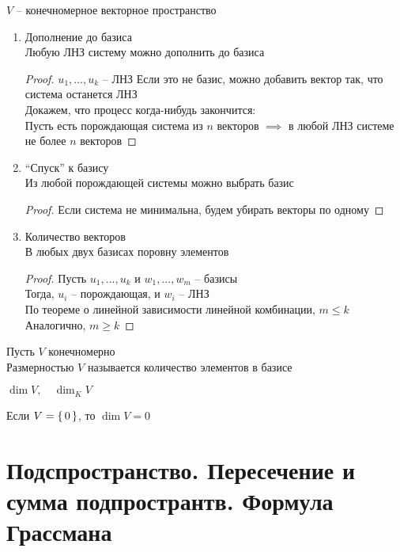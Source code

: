 \begin{properties}[базиса]
	$ V $ -- конечномерное векторное пространство
    \begin{enumerate}
    	\item Дополнение до базиса \\
        Любую ЛНЗ систему можно дополнить до базиса
        \begin{proof}
            $ u_1, ..., u_k $ -- ЛНЗ
            Если это не базис, можно добавить вектор так, что система останется ЛНЗ\footnotemark \\
            Докажем, что процесс когда-нибудь закончится: \\
            Пусть есть порождающая система из $n$ векторов $ \implies $ в любой ЛНЗ системе не более $n$ векторов
        \end{proof}
        \item ``Спуск'' к базису \\
        Из любой порождающей системы можно выбрать базис
        \begin{proof}
        	Если система не минимальна, будем убирать векторы по одному
        \end{proof}
        \item Количество векторов \\
        В любых двух базисах поровну элементов
        \begin{proof}
            Пусть $ u_1, ..., u_k $ и $ w_1, ..., w_m $ -- базисы \\
            Тогда, $u_i$ -- порождающая, и $w_i$ -- ЛНЗ \\
            По теореме о линейной зависимости линейной комбинации, $m \le k $ \\
            Аналогично, $ m \ge k $
        \end{proof}
    \end{enumerate}
\end{properties}

\begin{definition}
	Пусть $V$ конечномерно \\
    Размерностью $V$ называется количество элементов в базисе
    \begin{notation}
        $ \dim V, \quad \dim_K V $
    \end{notation}
    Если $ V = \set{0} $, то $ \dim V = 0 $
\end{definition}

\section{Подспространство. Пересечение и сумма подпространтв. Формула Грассмана}

